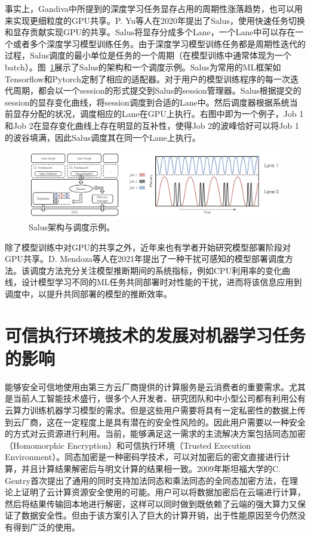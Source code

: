 事实上，Gandiva中所提到的深度学习任务显存占用的周期性涨落趋势，也可以用来实现更细粒度的GPU共享。P. Yu等人在2020年提出了Salus\parencite{yu2020salus}，使用快速任务切换和显存贡献实现GPU的共享。Salus将显存分成多个Lane，一个Lane中可以存在一个或者多个深度学习模型训练任务。由于深度学习模型训练任务都是周期性迭代的过程，Salus调度的最小单位是任务的一个周期（在模型训练中通常体现为一个batch）。图~\ref{salus_arch_sche}展示了Salus的架构和一个调度示例。Salus为常用的ML框架如Tensorflow和Pytorch定制了相应的适配器。对于用户的模型训练程序的每一次迭代周期，都会以一个session的形式提交到Salus的session管理器。Salus根据提交的session的显存变化曲线，将session调度到合适的Lane中。然后调度器根据系统当前显存分配的状况，调度相应的Lane在GPU上执行。右图中即为一个例子，Job 1 和Job 2在显存变化曲线上存在明显的互补性，使得Job 2的波峰恰好可以将Job 1的波谷填满，因此Salus调度其在同一个Lane上执行。

\begin{figure}[h]
    \centerline{\includegraphics[width=\textwidth]{figures/salus-arch-sche.png}}
    \caption{Salus架构与调度示例。}
    \label{salus_arch_sche}
\end{figure}

除了模型训练中对GPU的共享之外，近年来也有学者开始研究模型部署阶段对GPU共享。D. Mendoza等人\parencite{10.1145/3437984.3458837}在2021年提出了一种干扰可感知的模型部署调度方法。该调度方法充分关注模型推断期间的系统指标，例如CPU利用率的变化曲线，设计模型学习不同的ML任务共同部署时对性能的干扰，进而将该信息应用到调度中，以提升共同部署的模型的推断效率。

\section{可信执行环境技术的发展对机器学习任务的影响}
能够安全可信地使用由第三方云厂商提供的计算服务是云消费者的重要需求。尤其是当前人工智能技术盛行，很多个人开发者、研究团队和中小型公司都有利用公有云算力训练机器学习模型的需求。但是这些用户需要将具有一定私密性的数据上传到云厂商，这在一定程度上是具有潜在的安全性风险的。因此用户需要以一种安全的方式对云资源进行利用。当前，能够满足这一需求的主流解决方案包括同态加密（Homomorphic Encryption）\parencite{shacham2013compact}和可信执行环境（Trusted Execution Environment）\parencite{seibel2017trusted}。同态加密是一种密码学技术，可以对加密后的密文直接进行计算，并且计算结果解密后与明文计算的结果相一致。2009年斯坦福大学的C. Gentry首次提出了通用的同时支持加法同态和乘法同态的全同态加密方法\parencite{gentry2009fully}，在理论上证明了云计算资源安全使用的可能。用户可以将数据加密后在云端进行计算，然后将结果传输回本地进行解密，这样可以同时做到既依赖了云端的强大算力又保证了数据安全性。但由于该方案引入了巨大的计算开销，出于性能原因至今仍然没有得到广泛的使用。

